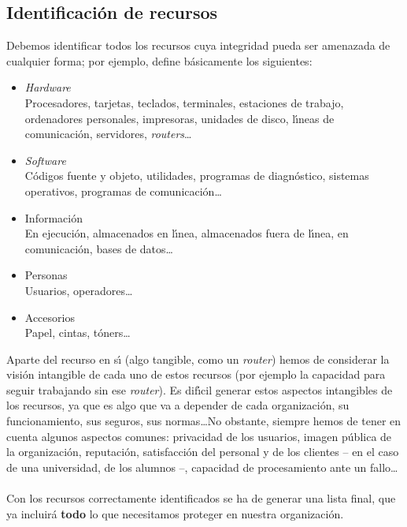 \subsection{Identificaci\'on de recursos}
Debemos identificar todos los recursos cuya integridad pueda ser amenazada de
cualquier forma; por ejemplo, \cite{kn:rfc1244} define b\'asicamente los 
siguientes: 
\begin{itemize}
\item {\it Hardware}\\
Procesadores, tarjetas, teclados, terminales, estaciones de trabajo, ordenadores
personales, impresoras, unidades de disco, l\'{\i}neas de comunicaci\'on, 
servidores, {\it routers}\ldots
\item {\it Software}\\
C\'odigos fuente y objeto, utilidades, programas de diagn\'ostico, sistemas 
operativos, programas de comunicaci\'on\ldots
\item Informaci\'on\\
En ejecuci\'on, almacenados en l\'{\i}nea, almacenados fuera de l\'{\i}nea,
en comunicaci\'on, bases de datos\ldots
\item Personas\\
Usuarios, operadores\ldots
\item Accesorios\\
Papel, cintas, t\'oners\ldots
\end{itemize}
Aparte del recurso en s\'{\i} (algo tangible, como un {\it router}) hemos de 
considerar la visi\'on intangible de cada uno de estos recursos (por ejemplo
la capacidad para seguir trabajando sin ese {\it router}). Es dif\'{\i}cil
generar estos aspectos intangibles de los recursos, ya que es algo que va a
depender de cada organizaci\'on, su funcionamiento, sus seguros, sus 
normas\ldots No obstante, siempre hemos de tener en cuenta algunos aspectos
comunes: privacidad de los usuarios, imagen p\'ublica de la organizaci\'on,
reputaci\'on, satisfacci\'on del personal y de los clientes -- en el caso de una
universidad, de los alumnos --, capacidad de procesamiento ante un 
fallo\ldots\\
\\Con los recursos correctamente identificados se ha de generar una lista 
final, que ya incluir\'a {\bf todo} lo que necesitamos proteger en nuestra 
organizaci\'on.
